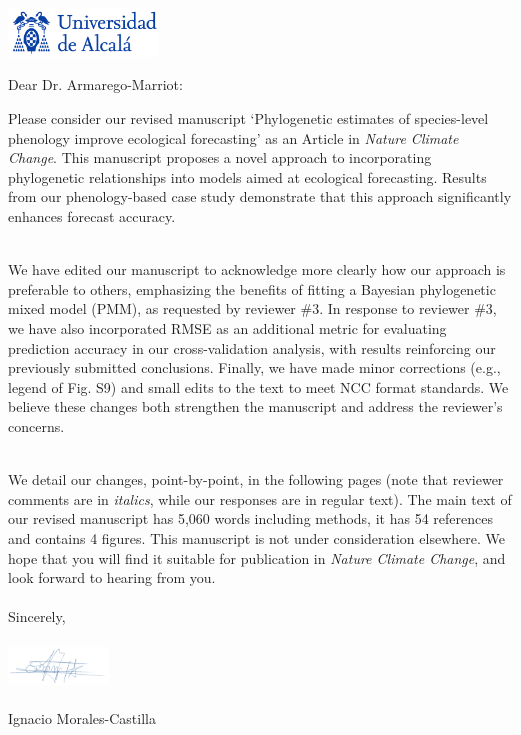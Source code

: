 \documentclass[11pt,a4paper]{letter}
\begin{document}
\begin{letter}{}
\includegraphics[width=0.3\textwidth]{logo_uah.png}

\opening{Dear Dr. Armarego-Marriot:} %

\noindent Please consider our revised manuscript `Phylogenetic estimates of species-level phenology improve ecological forecasting' as an Article in \emph{Nature Climate Change}. This manuscript proposes a novel approach to incorporating phylogenetic relationships into models aimed at ecological forecasting. Results from our phenology-based case study demonstrate that this approach significantly enhances forecast accuracy.


\vspace{1.5ex}\\
\noindent We have edited our manuscript to acknowledge more clearly how our approach is preferable to others, emphasizing the benefits of fitting a Bayesian phylogenetic mixed model (PMM), as requested by reviewer \#3. In response to reviewer \#3, we have also incorporated RMSE as an additional metric for evaluating prediction accuracy in our cross-validation analysis, with results reinforcing our previously submitted conclusions. Finally, we have made minor corrections (e.g., legend of Fig. S9) and small edits to the text to meet NCC format standards. We believe these changes both strengthen the manuscript and address the reviewer's concerns. 


\vspace{1.5ex}\\
\noindent We detail our changes, point-by-point, in the following pages (note that reviewer comments are in \emph{italics}, while our responses are in regular text). The main text of our revised manuscript has 5,060 words including methods, it has 54 references and contains 4 figures. This manuscript is not under consideration elsewhere.  We hope that you will find it suitable for publication in \emph{Nature Climate Change}, and look forward to hearing from you.
\vspace{2.5ex}\\



\vspace{1.5ex}\\
\noindent Sincerely,\\
\vspace{1.5ex}\\
 \includegraphics[width=0.2\textwidth]{Signature_IMC.png} \\
 \vspace{1.5ex}\\
\noindent Ignacio Morales-Castilla



\end{letter}
\end{document}
